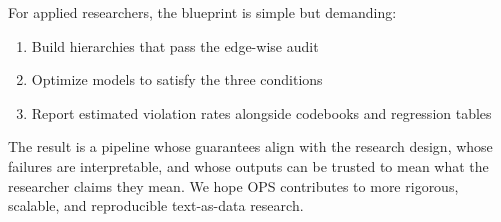For applied researchers, the blueprint is simple but demanding:
\begin{enumerate}[nosep]
    \item Build hierarchies that pass the edge-wise audit
    \item Optimize models to satisfy the three conditions
    \item Report estimated violation rates alongside codebooks and regression tables
\end{enumerate}

The result is a pipeline whose guarantees align with the research design, whose failures are interpretable, and whose outputs can be trusted to mean what the researcher claims they mean. We hope OPS contributes to more rigorous, scalable, and reproducible text-as-data research.



